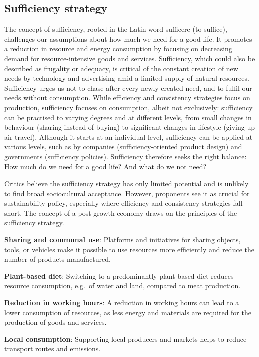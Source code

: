 \documentclass[
  a4paper,
  openany]{book}
\begin{document}
\subsection{Sufficiency strategy}\label{sufficiency-strategy}

The concept of sufficiency, rooted in the Latin word sufficere (to
suffice), challenges our assumptions about how much we need for a good
life. It promotes a reduction in resource and energy consumption by
focusing on decreasing demand for resource-intensive goods and services.
Sufficiency, which could also be described as frugality or adequacy, is
critical of the constant creation of new needs by technology and
advertising amid a limited supply of natural resources. Sufficiency
urges us not to chase after every newly created need, and to fulfil our
needs without consumption. While efficiency and consistency strategies
focus on production, sufficiency focuses on consumption, albeit not
exclusively: sufficiency can be practised to varying degrees and at
different levels, from small changes in behaviour (sharing instead of
buying) to significant changes in lifestyle (giving up air travel).
Although it starts at an individual level, sufficiency can be applied at
various levels, such as by companies (sufficiency-oriented product
design) and governments (sufficiency policies). Sufficiency therefore
seeks the right balance: How much do we need for a good life? And what
do we not need?

Critics believe the sufficiency strategy has only limited potential and
is unlikely to find broad sociocultural acceptance. However, proponents
see it as crucial for sustainability policy, especially where efficiency
and consistency strategies fall short. The concept of a post-growth
economy draws on the principles of the sufficiency strategy.

\begin{tcolorbox}[enhanced jigsaw, coltitle=black, bottomtitle=1mm, opacitybacktitle=0.6, titlerule=0mm, opacityback=0, leftrule=.75mm, colbacktitle=quarto-callout-tip-color!10!white, bottomrule=.15mm, toptitle=1mm, breakable, title={Putting Sufficiency Strategies into Action: Examples}, arc=.35mm, rightrule=.15mm, toprule=.15mm, left=2mm, colback=white, colframe=quarto-callout-tip-color-frame]

\textbf{Sharing and communal use}: Platforms and initiatives for sharing
objects, tools, or vehicles make it possible to use resources more
efficiently and reduce the number of products manufactured.

\textbf{Plant-based diet}: Switching to a predominantly plant-based diet
reduces resource consumption, e.g.~of water and land, compared to meat
production.

\textbf{Reduction in working hours}: A reduction in working hours can
lead to a lower consumption of resources, as less energy and materials
are required for the production of goods and services.

\textbf{Local consumption}: Supporting local producers and markets helps
to reduce transport routes and emissions.

\end{tcolorbox}
\end{document}
